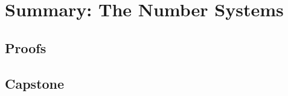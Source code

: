 \chapter{Summary: The Number Systems}
\label{chap:numbers-summary}




\LRAExcludeFromPrintEditionBegin
\section*{Proofs}


\section*{Capstone}

\LRAExcludeFromPrintEditionEnd

